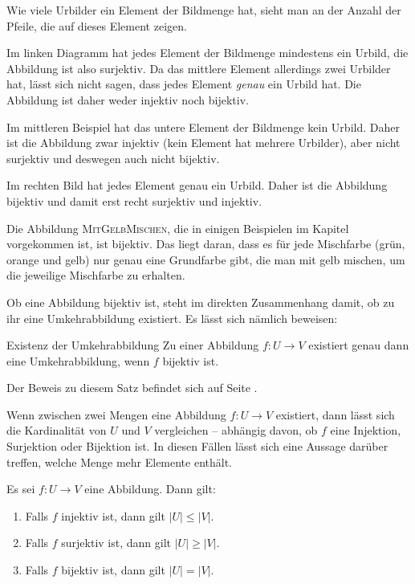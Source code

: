 \documentclass[../../main.tex]{subfiles}
\begin{document}
Wie viele Urbilder ein Element der Bildmenge hat, sieht man an der Anzahl der Pfeile, die auf dieses Element zeigen.

Im linken Diagramm hat jedes Element der Bildmenge mindestens ein Urbild, die Abbildung ist also surjektiv. Da das mittlere Element allerdings zwei Urbilder hat, lässt sich nicht sagen, dass jedes Element \emph{genau} ein Urbild hat. Die Abbildung ist daher weder injektiv noch bijektiv.

Im mittleren Beispiel hat das untere Element der Bildmenge kein Urbild. Daher ist die Abbildung zwar injektiv (kein Element hat mehrere Urbilder), aber nicht surjektiv und deswegen auch nicht bijektiv.

Im rechten Bild hat jedes Element genau ein Urbild. Daher ist die Abbildung bijektiv und damit erst recht surjektiv und injektiv.

\begin{example}{}
    Die Abbildung \textsc{MitGelbMischen}, die in einigen Beispielen im Kapitel vorgekommen ist, ist bijektiv. Das liegt daran, dass es für jede Mischfarbe (grün, orange und gelb) nur genau eine Grundfarbe gibt, die man mit gelb mischen, um die jeweilige Mischfarbe zu erhalten.
\end{example}

Ob eine Abbildung bijektiv ist, steht im direkten Zusammenhang damit, ob zu ihr eine Umkehrabbildung existiert. Es lässt sich nämlich beweisen:

\begin{theorem}{Existenz der Umkehrabbildung}
    Zu einer Abbildung $f\colon U\rightarrow V$ existiert genau dann eine Umkehrabbildung, wenn $f$ bijektiv ist.
\end{theorem}

Der Beweis zu diesem Satz befindet sich auf Seite \pageref{proof:existenceOfInverseMap}.

Wenn zwischen zwei Mengen eine Abbildung $f\colon U\rightarrow V$ existiert, dann lässt sich die Kardinalität von $U$ und $V$ vergleichen -- abhängig davon, ob $f$ eine Injektion, Surjektion oder Bijektion ist. In diesen Fällen lässt sich eine Aussage darüber treffen, welche Menge mehr Elemente enthält.

\begin{theorem}{}
    Es sei $f\colon U\rightarrow V$ eine Abbildung. Dann gilt:
    \begin{enumerate}
        \item Falls $f$ injektiv ist, dann gilt $|U|\leq |V|$.
        \item Falls $f$ surjektiv ist, dann gilt $|U|\geq |V|$.
        \item Falls $f$ bijektiv ist, dann gilt $|U|=|V|$.
    \end{enumerate}
\end{theorem}
\end{document}
